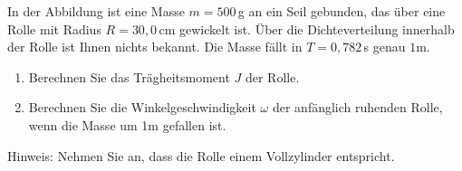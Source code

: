 \begin{ExerciseBlock}
In der Abbildung ist eine Masse $m = 500\,$g an ein Seil gebunden, das über eine Rolle mit Radius $R = 30,0\,$cm gewickelt ist. Über die Dichteverteilung innerhalb der Rolle ist Ihnen nichts bekannt. Die Masse fällt in $T=0,782\,$s genau $1$m.

\begin{enumerate}
	\item Berechnen Sie das Trägheitsmoment $J$ der Rolle.

	\item Berechnen Sie die Winkelgeschwindigkeit $\omega$ der anfänglich ruhenden Rolle, wenn die Masse um 1m gefallen ist.

\end{enumerate}

\begin{center}
\end{center}

Hinweis: Nehmen Sie an, dass die Rolle einem Vollzylinder entspricht.
\end{ExerciseBlock}
